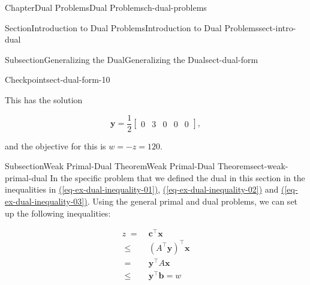 \documentclass[oneside,10pt,]{book}
\newcommand{\xreffont}{\relax}
\numberwithin{equation}{section}
\newcommand{\amp}{&}
\begin{document}
\begin{chapterptx}{Chapter}{Dual Problems}{}{Dual Problems}{}{}{ch-dual-problems}
\begin{sectionptx}{Section}{Introduction to Dual Problems}{}{Introduction to Dual Problems}{}{}{sect-intro-dual}
\begin{subsectionptx}{Subsection}{Generalizing the Dual}{}{Generalizing the Dual}{}{}{sect-dual-form}
\begin{inlineexercise}{Checkpoint}{}{sect-dual-form-10}
\begin{equation*}
\end{equation*}
%
\par
This has the solution%
\par
%
\begin{equation*}
\boldsymbol{y} = \frac{1}{2} \left[\begin{array}{rrr|rr} 0 \amp 3 \amp 0 \amp 0 \amp 0 \end{array}\right],
\end{equation*}
%
\par
and the objective for this is \(w=-z = 120\).%
\end{inlineexercise}%
\end{subsectionptx}
%
%
\typeout{************************************************}
\typeout{************************************************}
%
\begin{subsectionptx}{Subsection}{Weak Primal-Dual Theorem}{}{Weak Primal-Dual Theorem}{}{}{sect-weak-primal-dual}
In the specific problem that we defined the dual in this section in the inequalities in \hyperref[eq-ex-dual-inequality-01]{({\xreffont\ref{eq-ex-dual-inequality-01}})}, \hyperref[eq-ex-dual-inequality-02]{({\xreffont\ref{eq-ex-dual-inequality-02}})} and \hyperref[eq-ex-dual-inequality-03]{({\xreffont\ref{eq-ex-dual-inequality-03}})}.  Using the general primal and dual problems, we can set up the following inequalities:%
\par
%
\begin{align}
z \; = \; \amp \boldsymbol{c}^{\intercal} \boldsymbol{x} \label{eq-objective-inequality-01}\\
\; \leq \;\amp (A^{\intercal} \boldsymbol{y})^{\intercal} \boldsymbol{x}  \label{eq-objective-inequality-02}\\
\; = \; \amp \boldsymbol{y}^{\intercal} A \boldsymbol{x} \label{eq-objective-inequality-03}\\
\;\leq\; \amp \boldsymbol{y}^{\intercal} \boldsymbol{b} = w \label{eq-objective-inequality-04}
\end{align}
%
\par

\end{subsectionptx}
\end{sectionptx}
\end{chapterptx}
\end{document}
